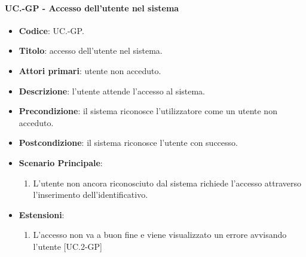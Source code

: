 	\paragraph{UC\theuccount.\thesubuccount-GP - Accesso dell'utente nel sistema}
		\begin{itemize}
			\item \textbf{Codice}: UC\theuccount.\thesubuccount-GP.
			\item \textbf{Titolo}: accesso dell'utente nel sistema.
			\item \textbf{Attori primari}: utente non acceduto.
			\item \textbf{Descrizione}: l'utente attende l'accesso al sistema.
			\item \textbf{Precondizione}: il sistema riconosce l'utilizzatore come un utente non acceduto.
			\item \textbf{Postcondizione}: il sistema riconosce l'utente con successo.
			\item \textbf{Scenario Principale}:
			\begin{enumerate}
				\item L’utente non ancora riconosciuto dal sistema richiede l'accesso attraverso l'inserimento dell'identificativo.
			\end{enumerate}
			\item \textbf{Estensioni}:
			\begin{enumerate}
				\item L'accesso non va a buon fine e viene visualizzato un errore avvisando l'utente [UC\theuccount.2-GP]
			\end{enumerate}
		\end{itemize}
		
		\newpage
		
